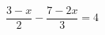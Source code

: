 \begin{ex}[type=equation]
	\begin{condition}
		$\dfrac{3-x}{2}-\dfrac{7-2x}{3}=4$
	\end{condition}
\end{ex}